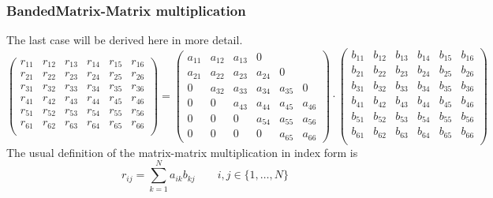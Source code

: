 \subsubsection{BandedMatrix-Matrix multiplication}
The last case will be derived here in more detail.
\begin{equation}
  \label{eq:bmatmatmat}
  \left(\begin{array}{cccccc}
    r_{11} &r_{12} &r_{13}& r_{14} & r_{15} & r_{16}\\
    r_{21} &r_{22} &r_{23}& r_{24} & r_{25} & r_{26}\\
    r_{31} &r_{32} &r_{33}& r_{34} & r_{35} & r_{36}\\\hline
    r_{41} &r_{42} &r_{43}& r_{44} & r_{45} & r_{46} \\
    r_{51} &r_{52} &r_{53}& r_{54} & r_{55} & r_{56} \\
    r_{61} &r_{62} &r_{63}& r_{64} & r_{65} & r_{66}\\
  \end{array}\right) =
  \left(\begin{array}{cccccc}
    a_{11} &a_{12} &a_{13}& 0\\
    a_{21} &a_{22} &a_{23}& a_{24} & 0\\
    0 &a_{32} &a_{33}& a_{34} & a_{35} & 0\\\hline
    0 & 0 &a_{43} &a_{44}& a_{45} & a_{46} \\
    0 & 0 &0 &a_{54} &a_{55}& a_{56}\\
    0 & 0 & 0 &0 &a_{65} &a_{66}
  \end{array}\right)
\cdot
  \left(\begin{array}{cccccccc}
    b_{11} &b_{12} &b_{13}& b_{14} & b_{15} & b_{16}\\
    b_{21} &b_{22} &b_{23}& b_{24} & b_{25} & b_{26}\\
    b_{31} &b_{32} &b_{33}& b_{34} & b_{35} & b_{36}\\\hline
    b_{41} &b_{42} &b_{43}& b_{44} & b_{45} & b_{46}\\
    b_{51} &b_{52} &b_{53}& b_{54} & b_{55} & b_{56}\\
    b_{61} &b_{62} &b_{63}& b_{64} & b_{65} & b_{66}\\
  \end{array}\right)
\end{equation}
The usual definition of the matrix-matrix multiplication in index form
is
\begin{displaymath}
  r_{ij}=\sum_{k=1}^N a_{ik} b_{kj}\qquad i,j\in\{1,\ldots,N\}
\end{displaymath}
